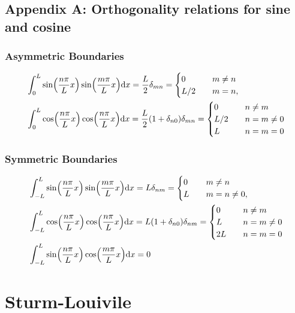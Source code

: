 \section{Appendix A: Orthogonality relations for sine and cosine}

\subsection*{Asymmetric Boundaries}

\begin{align*}
&\int_0^L \sin(\frac{n\pi}{L} x) \sin(\frac{m\pi}{L} x) \text{d} x 
  =	\frac{L}{2} \delta_{mn}
	= \begin{cases}
		0  &\quad m \neq n \\
		L/2 &\quad m = n, 
	\end{cases} \\
&\int_0^L \cos(\frac{n\pi}{L} x) \cos(\frac{n\pi}{L} x) \text{d} x 
	= \frac{L}{2} (1 + \delta_{n0}) \delta_{mn} 
	= \begin{cases}
		0 &\quad n\neq m \\
		L/2 &\quad n = m \neq 0 \\
		L &\quad n = m = 0 
	\end{cases}
\end{align*}

\subsection*{Symmetric Boundaries}
 
\begin{align*}
	&\int_{-L}^L \sin(\frac{n\pi}{L} x) \sin(\frac{m\pi}{L} x) \text{d} x 
	  = L \delta_{nm}
	  = \begin{cases}
			0  &\quad m \neq n \\
			L &\quad m = n \neq 0 , 
		\end{cases} \\
	&\int_{-L}^L \cos(\frac{n\pi}{L} x) \cos(\frac{n\pi}{L} x) \text{d} x 
		= L (1 + \delta_{n0})\delta_{nm}	
		= \begin{cases}
			0 &\quad n\neq m \\
			L &\quad n = m \neq 0 \\
			2L &\quad n = m = 0  
		\end{cases} \\
  &\int_{-L}^L \sin(\frac{n\pi}{L} x)\cos(\frac{m\pi}{L} x) \text{d} x 
	 = 0 
\end{align*}



\chapter{Sturm-Louivile}  

